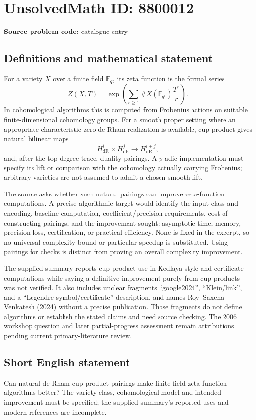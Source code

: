 \documentclass[11pt]{article}
\begin{document}
\section*{UnsolvedMath ID: 8800012}
\textbf{Source problem code:} catalogue entry
\subsection{Definitions and mathematical statement}
For a variety \(X\) over a finite field \(\mathbb F_q\), its zeta function is the formal series
\[
 Z(X,T)=\exp\left(\sum_{r\ge1}\#X(\mathbb F_{q^r})\frac{T^r}{r}\right).
\]
In cohomological algorithms this is computed from Frobenius actions on suitable finite-dimensional cohomology groups. For a smooth proper setting where an appropriate characteristic-zero de Rham realization is available, cup product gives natural bilinear maps
\[
 H^i_{\mathrm{dR}}\times H^j_{\mathrm{dR}}\longrightarrow H^{i+j}_{\mathrm{dR}},
\]
and, after the top-degree trace, duality pairings. A \(p\)-adic implementation must specify its lift or comparison with the cohomology actually carrying Frobenius; arbitrary varieties are not assumed to admit a chosen smooth lift.

The source asks whether such natural pairings can improve zeta-function computations. A precise algorithmic target would identify the input class and encoding, baseline computation, coefficient/precision requirements, cost of constructing pairings, and the improvement sought: asymptotic time, memory, precision loss, certification, or practical efficiency. None is fixed in the excerpt, so no universal complexity bound or particular speedup is substituted. Using pairings for checks is distinct from proving an overall complexity improvement.

The supplied summary reports cup-product use in Kedlaya-style and certificate computations while saying a definitive improvement purely from cup products was not verified. It also includes unclear fragments ``google2024'', ``Klein/link'', and a ``Legendre symbol/certificate'' description, and names Roy--Saxena--Venkatesh (2024) without a precise publication. Those fragments do not define algorithms or establish the stated claims and need source checking. The 2006 workshop question and later partial-progress assessment remain attributions pending current primary-literature review.
\subsection{Short English statement}
Can natural de Rham cup-product pairings make finite-field zeta-function algorithms better? The variety class, cohomological model and intended improvement must be specified; the supplied summary's reported uses and modern references are incomplete.
\end{document}
